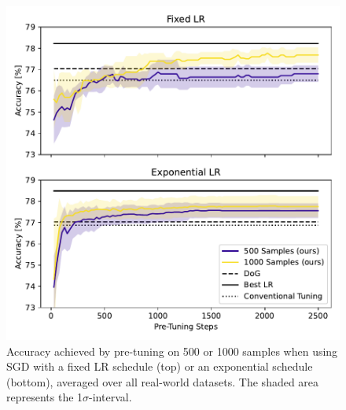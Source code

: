 \documentclass[letterpaper]{article} %
\begin{document}
\begin{figure}[h]
	\centering
	\includegraphics[width=.47\textwidth]{figures/pretune_1x64_fixed_vs_exp_schedule.pdf}
	\caption{Accuracy achieved by pre-tuning on 500 or 1000 samples when using SGD with a fixed LR schedule (top) or an exponential schedule (bottom), averaged over all real-world datasets. The shaded area represents the 1$\sigma$-interval.}\label{fig:pretune_fixed_vs_exp_lr}
\end{figure}
\end{document}
